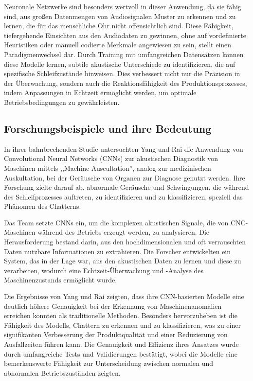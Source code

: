 Neuronale Netzwerke sind besonders wertvoll in dieser Anwendung, da sie fähig sind, aus großen Datenmengen von Audiosignalen Muster zu erkennen und zu lernen, die für das menschliche Ohr nicht offensichtlich sind. Diese Fähigkeit, tiefergehende Einsichten aus den Audiodaten zu gewinnen, ohne auf vordefinierte Heuristiken oder manuell codierte Merkmale angewiesen zu sein, stellt einen Paradigmenwechsel dar. Durch Training mit umfangreichen Datensätzen können diese Modelle lernen, subtile akustische Unterschiede zu identifizieren, die auf spezifische Schleifzustände hinweisen. Dies verbessert nicht nur die Präzision in der Überwachung, sondern auch die Reaktionsfähigkeit des Produktionsprozesses, indem Anpassungen in Echtzeit ermöglicht werden, um optimale Betriebsbedingungen zu gewährleisten.


\subsection{Forschungsbeispiele und ihre Bedeutung}

In ihrer bahnbrechenden Studie \cite{Yang2019} untersuchten Yang und Rai die Anwendung von Convolutional Neural Networks (CNNs) zur akustischen Diagnostik von Maschinen mittels ,,Machine Auscultation'', analog zur medizinischen Auskultation, bei der Geräusche von Organen zur Diagnose genutzt werden. Ihre Forschung zielte darauf ab, abnormale Geräusche und Schwingungen, die während des Schleifprozesses auftreten, zu identifizieren und zu klassifizieren, speziell das Phänomen des Chatterns.

Das Team setzte CNNs ein, um die komplexen akustischen Signale, die von CNC-Maschinen während des Betriebs erzeugt werden, zu analysieren. Die Herausforderung bestand darin, aus den hochdimensionalen und oft verrauschten Daten nutzbare Informationen zu extrahieren. Die Forscher entwickelten ein System, das in der Lage war, aus den akustischen Daten zu lernen und diese zu verarbeiten, wodurch eine Echtzeit-Überwachung und -Analyse des Maschinenzustands ermöglicht wurde.

Die Ergebnisse von Yang und Rai zeigten, dass ihre CNN-basierten Modelle eine deutlich höhere Genauigkeit bei der Erkennung von Maschinenanomalien erreichen konnten als traditionelle Methoden. Besonders hervorzuheben ist die Fähigkeit des Modells, Chattern zu erkennen und zu klassifizieren, was zu einer signifikanten Verbesserung der Produktqualität und einer Reduzierung von Ausfallzeiten führen kann. Die Genauigkeit und Effizienz ihres Ansatzes wurde durch umfangreiche Tests und Validierungen bestätigt, wobei die Modelle eine bemerkenswerte Fähigkeit zur Unterscheidung zwischen normalen und abnormalen Betriebszuständen zeigten.

